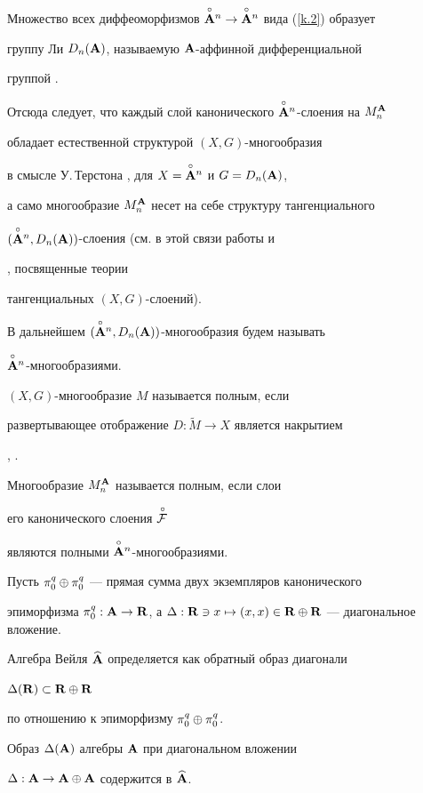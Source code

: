 Множество всех диффеоморфизмов $\overset{\circ}{\bold A}{}^n\to\overset{\circ}{\bold A}{}^n$ вида (\ref{k.2}) образует


группу Ли $D_n({\bold A})$, называемую ${\bold A}$-аффинной дифференциальной


группой \cite{VSh4}.


Отсюда следует, что каждый слой канонического $\overset{\circ}{\bold A}{}^n$-слоения на $M_n^{\bold A}$


обладает естественной структурой  $(X,G)$-многообразия


в смысле У.\,Терстона \cite{Thur}, \cite{Apan} для $X=\overset{\circ}{\bold A}{}^n$ и $G=D_n({\bold A})$,


а само многообразие  $M_n^{\bold A}$ несет на себе структуру тангенциального


$(\overset{\circ}{\bold A}{}^n,D_n({\bold A}))$-слоения (см. в этой связи работы \cite{Mal3} и


\cite{Inaba-M}, посвященные теории


тангенциальных $(X,G)$-слоений).


В дальнейшем  $(\overset{\circ}{\bold A}{}^n,D_n({\bold A}))$-многообразия будем называть


$\overset{\circ}{\bold A}{}^n$-многообразиями.





$(X,G)$-многообразие $M$ называется полным, если


развертывающее отображение $D:\widetilde M\to X$ является накрытием


\cite{Thur}, \cite{Inaba-M}.   %


Многообразие  $M^{\bold A}_n$ называется полным, если слои


его канонического слоения $\overset{\,\circ}{\cal F}{}$


являются полными  $\overset{\circ}{\bold A}{}^n$-многообразиями.





Пусть ${\pi^q_0}\oplus{\pi^q_0}$ --- прямая сумма двух экземпляров канонического


эпиморфизма  $\piqo:\A\to\R$, а $\Delta:\R\ni x\mapsto


(x,x)\in\R\oplus\R$ --- диагональное вложение.


Алгебра Вейля  $\widehat{{\bold A}}$ определяется как обратный образ диагонали


$\Delta({\bold R})\subset{\bold R}\oplus{\bold R}$


по отношению к эпиморфизму ${\pi^q_0}\oplus{\pi^q_0}$.


Образ $\Delta({\bold A})$ алгебры ${\bold A}$ при диагональном вложении


$\Delta:{\bold A}\to{\bold A}\oplus{\bold A}$ содержится в $\widehat{{\bold A}}$.


